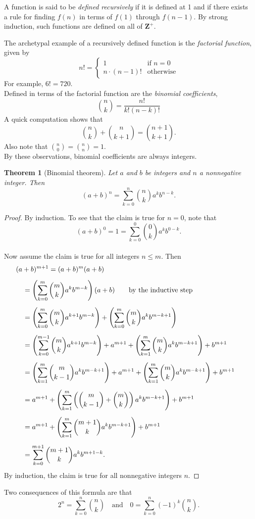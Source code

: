 \documentclass{amsbook}
\numberwithin{section}{chapter}
\theoremstyle{plain}
\newtheorem{thm}{Theorem}[section]
\theoremstyle{definition}
\def\br{~\\[1em]}
\def\ZZ{\mathbf Z}
\begin{document}
A function is said to be \textit{defined recursively} if it is defined
at 1 and if there exists a rule for finding $f(n)$ in terms of
$f(1)$ through $f(n-1)$. By strong induction,
such functions are defined on all of $\ZZ^+$.

\pagebreak

The archetypal example of a recursively defined function is the
\textit{factorial function}, given by
\[n! = \begin{cases}1 &\text{if }n = 0\\
n\cdot(n - 1)!&\text{otherwise}\end{cases}\]
For example, $6! = 720$.
\br
Defined in terms of the factorial function are the
\textit{binomial coefficients},
\[{n\choose k} = \frac{n!}{k!(n-k)!}\]
A quick computation shows that
\[
{n\choose k} + {n\choose k + 1} = {n + 1\choose k + 1}.
\]
Also note that ${n\choose 0} = {n\choose n} = 1$.
\br
By these observations, binomial coefficients
are always integers.

\begin{thm}[Binomial theorem]
Let $a$ and $b$ be integers and $n$ a nonnegative integer.
Then
\[(a + b)^n = \sum_{k = 0}^n{n\choose k}a^kb^{n-k}.\]
\end{thm}

\begin{proof}
By induction. To see that the claim is true for $n = 0$, note that
\[(a + b)^0 = 1 = \sum_{k = 0}^0{0\choose k}a^kb^{0-k}.\]
\br
Now assume the claim is true for all integers $n\le m$. Then
\begin{align*}
&\hspace{-1em}(a + b)^{m + 1} = (a + b)^m(a + b)\\[0.5em]
&= \left(\sum_{k = 0}^m{m\choose k}a^kb^{m-k}\right)(a + b)
\qquad\text{by the inductive step}\\[0.5em]
&=  \left(\sum_{k = 0}^m{m\choose k}a^{k+1}b^{m-k}\right) + 
 \left(\sum_{k = 0}^m{m\choose k}a^kb^{m-k + 1}\right)\\[0.5em]
&=\left(\sum_{k = 0}^{m-1}{m\choose k}a^{k+1}b^{m-k}\right) + a^{m+1}+
 \left(\sum_{k = 1}^m{m\choose k}a^kb^{m-k + 1}\right)
+ b^{m+1}\\[0.5em]
&=  \left(\sum_{k = 1}^m{m\choose k-1}a^kb^{m-k+1}\right) + a^{m+1}+ 
 \left(\sum_{k = 1}^m{m\choose k}a^kb^{m-k + 1}\right)
+ b^{m+1}\\[0.5em]
&= a^{m+1}+  \left(\sum_{k = 1}^m\left({m\choose k-1}
+ {m\choose k}\right)a^kb^{m-k+1}\right) + b^{m+1}\\[0.5em]
&= a^{m+1}+  \left(\sum_{k = 1}^m{m + 1\choose k}a^kb^{m-k+1}\right)
+ b^{m+1}\\[0.5em]
&= \sum_{k = 0}^{m+1}{m + 1\choose k}a^kb^{m+1-k}.
\end{align*}
By induction, the claim is true for all nonnegative integers $n$.
\end{proof}
Two consequences of this formula are that
\[2^n = \sum_{k=0}^n{n\choose k}\quad\text{and}\quad
0 = \sum_{k=0}^n(-1)^k{n\choose k}.\]
\end{document}
